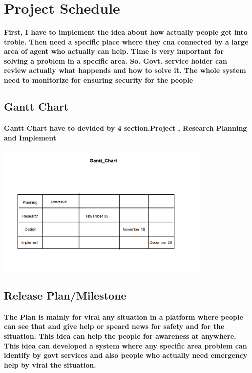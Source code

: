 \documentclass{article}
\begin{document}
\section{Project Schedule}
\paragraph{First, I have to implement the idea about how actually people get into troble. Then need a specific place where they cna connected by a large area of agent who actually can help. Time is very important for solving a problem in a specific area. So. Govt. service holder can review actually what happends and how to solve it. The whole system need to monitorize for ensuring security for  the people}

\subsection{Gantt Chart}
\paragraph{Gantt Chart have to devided by 4 section.Project , Research Planning and Implement}
\includegraphics[width=0.8\textwidth]{Gantt_Chart.png}


\subsection{Release Plan/Milestone}
\paragraph{The Plan is mainly for viral any situation in a platform where people can see that and give help or speard news for safety and for the situation. This idea can help the people for awareness at anywhere. This idea can developed a system where any specific area problem can identify by govt services and also people who actually need emergency help by viral the situation. }
\end{document}
